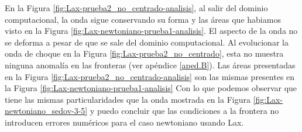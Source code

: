 \documentclass[12pt,a4paper]{book}
\begin{document}

En la Figura \ref{fig:Lax-prueba2_no_centrado-analisis}, al salir del dominio computacional, la onda sigue conservando su forma y las áreas que habiamos visto en la Figura \ref{fig:Lax-newtoniano-prueba1-analisis}. El aspecto de la onda no se deforma a pesar de que se sale del dominio computacional. Al evolucionar la onda de choque en la Figura \ref{fig:Lax-prueba2_no_centrado},
esta no muestra ninguna anomalía en las fronteras (ver apéndice \ref{aped.B}). 
Las áreas presentadas en la Figura \ref{fig:Lax-prueba2_no_centrado-analisis} son las mismas presentes en 
la Figura \ref{fig:Lax-newtoniano-prueba1-analisis} Con lo que podemos observar que tiene las mismas particularidades que la 
onda mostrada en la Figura \ref{fig:Lax-newtoniano_sedov-3-5} y puedo concluir que las condiciones a la frontera no introducen 
errores numéricos para el caso newtoniano usando Lax.%
\end{document}
